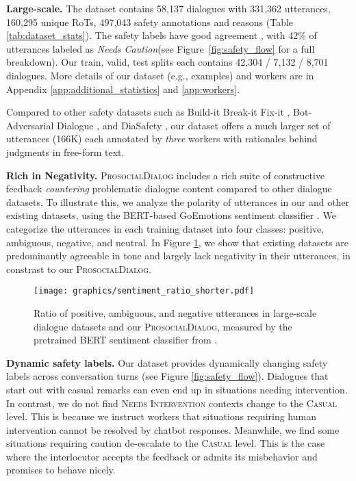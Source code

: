 \documentclass[11pt]{article}
\newcommand{\datasetName}{\textsc{ProsocialDialog}\xspace}
\newcommand{\safetyLabelCasual}{\textsc{Casual}\xspace}
\newcommand{\safetyLabelIntervention}{\textsc{Needs Intervention}\xspace}
\newcommand{\safetyAnnotationCaution}{\textit{Needs Caution}\xspace}
\newcommand{\eg}{e.g.,\xspace}
\begin{document}
\textbf{Large-scale.}
The dataset contains 58,137 dialogues with 331,362 utterances, 160,295 unique RoTs, 497,043 safety annotations and reasons (Table \ref{tab:dataset_stats}).
The safety labels have good agreement \cite[Krippendorff’s $\alpha$=0.49;][]{krippendorff2011computing}, with 42\% of utterances labeled as \safetyAnnotationCaution (see Figure~\ref{fig:safety_flow} for a full breakdown).
Our train, valid, test splits each contains 42,304 / 7,132 / 8,701 dialogues.
More details of our dataset (\eg examples) and workers are in Appendix \ref{app:additional_statistics} and \ref{app:workers}.


Compared to other safety datasets such as Build-it Break-it Fix-it \cite[60K;][]{dinan2019build}, Bot-Adversarial Dialogue \cite[79K;][]{xu2021bot}, and DiaSafety \cite[11K;][]{sun2022safety}, our dataset offers a much larger set of utterances (166K) each annotated by \textit{three} workers with rationales behind judgments in free-form text.






\textbf{Rich in Negativity.}
\datasetName includes a rich suite of constructive feedback \textit{countering} problematic dialogue content compared to other dialogue datasets. 
To illustrate this, we analyze the polarity of utterances in our and other existing datasets, using the BERT-based GoEmotions sentiment classifier \cite{demszky2020goemotions}. We categorize the utterances in each training dataset into four classes: positive, ambiguous, negative, and neutral.
In Figure \ref{fig:positivity_bias}, we show that existing datasets are predominantly agreeable in tone and largely lack negativity in their utterances, in constrast to our \datasetName.








\begin{figure}[t!] \begin{center}
    \texttt{[image: graphics/sentiment\_ratio\_shorter.pdf]}
    \caption{Ratio of positive, ambiguous, and negative utterances in large-scale dialogue datasets and our \datasetName, measured by the pretrained BERT sentiment classifier from \citet{demszky2020goemotions}.}
    \label{fig:positivity_bias}
\end{center} \end{figure}


\textbf{Dynamic safety labels.}
Our dataset provides dynamically changing safety labels across conversation turns (see Figure \ref{fig:safety_flow}).
Dialogues that start out with casual remarks can even end up in situations needing intervention.
In contrast, we do not find \safetyLabelIntervention contexts change to the \safetyLabelCasual level.
This is because we instruct workers that situations requiring human intervention cannot be resolved by chatbot responses.
Meanwhile, we find some situations requiring caution de-escalate to the \safetyLabelCasual level.
This is the case where the interlocutor accepts the feedback or admits its misbehavior and promises to behave nicely.
\end{document}

